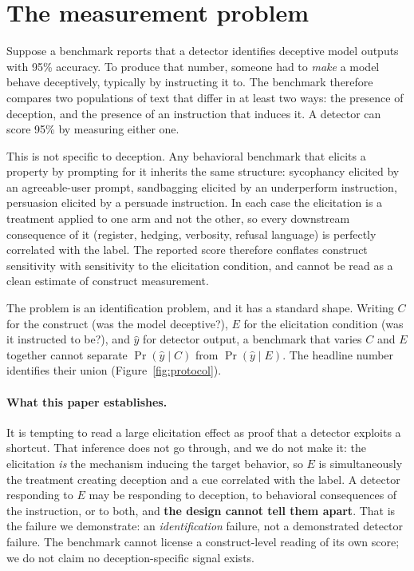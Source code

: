 \section{The measurement problem}
\label{sec:problem}

Suppose a benchmark reports that a detector identifies deceptive model outputs with 95\% accuracy. To produce that number, someone had to \emph{make} a model behave deceptively, typically by instructing it to. The benchmark therefore compares two populations of text that differ in at least two ways: the presence of deception, and the presence of an instruction that induces it. A detector can score 95\% by measuring either one.

This is not specific to deception. Any behavioral benchmark that elicits a property by prompting for it inherits the same structure: sycophancy elicited by an agreeable-user prompt, sandbagging elicited by an underperform instruction, persuasion elicited by a persuade instruction. In each case the elicitation is a treatment applied to one arm and not the other, so every downstream consequence of it (register, hedging, verbosity, refusal language) is perfectly correlated with the label. The reported score therefore conflates construct sensitivity with sensitivity to the elicitation condition, and cannot be read as a clean estimate of construct measurement.

The problem is an identification problem, and it has a standard shape. Writing $C$ for the construct (was the model deceptive?), $E$ for the elicitation condition (was it instructed to be?), and $\hat{y}$ for detector output, a benchmark that varies $C$ and $E$ together cannot separate $\Pr(\hat{y}\mid C)$ from $\Pr(\hat{y}\mid E)$. The headline number identifies their union (Figure~\ref{fig:protocol}).

\paragraph{What this paper establishes.} It is tempting to read a large elicitation effect as proof that a detector exploits a shortcut. That inference does not go through, and we do not make it: the elicitation \emph{is} the mechanism inducing the target behavior, so $E$ is simultaneously the treatment creating deception and a cue correlated with the label. A detector responding to $E$ may be responding to deception, to behavioral consequences of the instruction, or to both, and \textbf{the design cannot tell them apart}. That is the failure we demonstrate: an \emph{identification} failure, not a demonstrated detector failure. The benchmark cannot license a construct-level reading of its own score; we do not claim no deception-specific signal exists.

